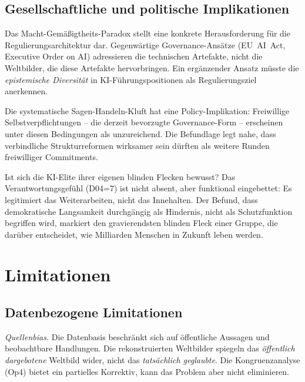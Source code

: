 \documentclass[12pt,a4paper]{article}
\begin{document}
\subsection{Gesellschaftliche und politische Implikationen}
\label{sec:diskussion:implikationen}

Das Macht-Gem\"a\ss{}igtheits-Paradox stellt eine konkrete Herausforderung f\"ur die Regulierungsarchitektur dar. Gegenw\"artige Governance-Ans\"atze (EU~AI~Act, Executive Order on AI) adressieren die technischen Artefakte, nicht die Weltbilder, die diese Artefakte hervorbringen. Ein erg\"anzender Ansatz m\"usste die \emph{epistemische Diversit\"at} in KI-F\"uhrungspositionen als Regulierungsziel anerkennen.

Die systematische Sagen-Handeln-Kluft hat eine Policy-Implikation: Freiwillige Selbstverpflichtungen -- die derzeit bevorzugte Governance-Form \citep[vgl.][]{Bengio2024} -- erscheinen unter diesen Bedingungen als unzureichend. Die Befundlage legt nahe, dass verbindliche Strukturreformen wirksamer sein d\"urften als weitere Runden freiwilliger Commitments.

Ist sich die KI-Elite ihrer eigenen blinden Flecken bewusst? Das Verantwortungsgef\"uhl (D04=7) ist nicht absent, aber funktional eingebettet: Es legitimiert das Weiterarbeiten, nicht das Innehalten. Der Befund, dass demokratische Langsamkeit durchg\"angig als Hindernis, nicht als Schutzfunktion begriffen wird, markiert den gravierendsten blinden Fleck einer Gruppe, die dar\"uber entscheidet, wie Milliarden Menschen in Zukunft leben werden.


\section{Limitationen}
\label{sec:limitationen}

\subsection{Datenbezogene Limitationen}

\emph{Quellenbias.} Die Datenbasis beschr\"ankt sich auf \"offentliche Aussagen und beobachtbare Handlungen. Die rekonstruierten Weltbilder spiegeln das \emph{\"offentlich dargebotene} Weltbild wider, nicht das \emph{tats\"achlich geglaubte}. Die Kongruenzanalyse (Op4) bietet ein partielles Korrektiv, kann das Problem aber nicht eliminieren.
\end{document}
